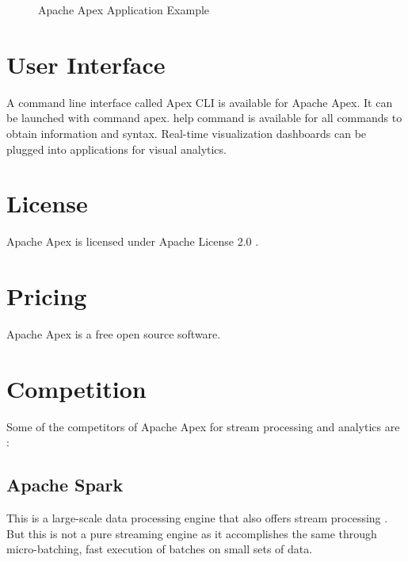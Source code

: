 \documentclass[9pt,twocolumn,twoside]{styles/osajnl}
\begin{document}
\begin{figure}[ht!]
\centering
{}
\caption{Apache Apex Application Example \cite{www-apacheapexblog}}
\label{fig:Apache Apex Application Example}
\end{figure}
\section{User Interface}
A command line interface called Apex CLI is available for Apache Apex.
It can be launched with command  apex.
help command is available for all commands to obtain information and syntax.
Real-time visualization dashboards can be plugged into applications for visual analytics.


\section{License}
Apache Apex is licensed under Apache License 2.0 \cite{www-apacheapexsite}.  

\section{Pricing}
Apache Apex is a free open source software.
\section{Competition}
Some of the competitors of Apache Apex for stream processing and analytics are \cite{www-apacheapexcompetition}:
\subsection{Apache Spark}
 This is a large-scale data processing engine that also offers stream processing \cite{www-apachesparksite}. But this is not a pure streaming engine as it accomplishes the same through micro-batching, fast execution of batches on small sets of data. 
\end{document}
